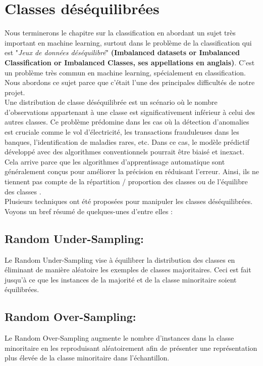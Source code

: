 \documentclass[12pt, french]{report}
\begin{document}
\section{Classes déséquilibrées}

Nous terminerons le chapitre sur la classification en abordant un sujet très important en machine learning, surtout dans le problème de la classification qui est "\textit{Jeux de données déséquilibré}" \textbf{(Imbalanced datasets or Imbalanced Classification or Imbalanced Classes, ses appellations en anglais)}. C'est un problème très commun en machine learning, spécialement en classification. Nous abordons ce sujet parce que c'était l'une des principales difficultés de notre projet. \\

Une distribution de classe déséquilibrée est un scénario où le nombre d'observations appartenant à une classe est significativement inférieur à celui des autres classes. 
Ce problème prédomine dans les cas où la détection d'anomalies est cruciale comme le vol d'électricité, les transactions frauduleuses dans les banques, l'identification de maladies rares, etc. Dans ce cas, le modèle prédictif développé avec des algorithmes conventionnels pourrait être biaisé et inexact.\\
Cela arrive parce que les algorithmes d'apprentissage automatique sont généralement conçus pour améliorer la précision en réduisant l'erreur. Ainsi, ils ne tiennent pas compte de la répartition / proportion des classes ou de l'équilibre des classes \cite{key19}.\\

Plusieurs techniques ont été proposées pour manipuler les classes déséquilibrées. Voyons un bref résumé de quelques-unes d'entre elles  \cite{key19}:
\subsection{Random Under-Sampling:}
Le Random Under-Sampling vise à équilibrer la distribution des classes en éliminant de manière aléatoire les exemples de classes majoritaires. Ceci est fait jusqu'à ce que les instances de la majorité et de la classe minoritaire soient équilibrées.
\subsection{Random Over-Sampling:}
Le Random Over-Sampling augmente le nombre d'instances dans la classe minoritaire en les reproduisant aléatoirement afin de présenter une représentation plus élevée de la classe minoritaire dans l'échantillon.
\end{document}
